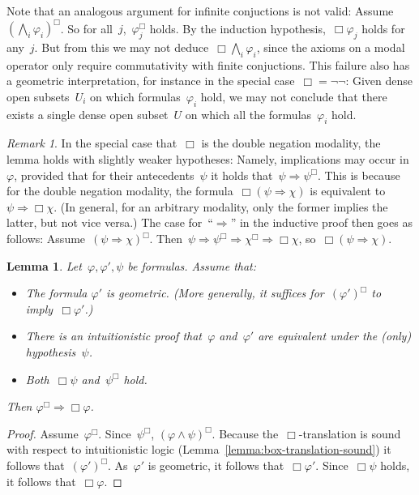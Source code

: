 \documentclass[10pt]{amsart}
\theoremstyle{definition}
\theoremstyle{plain}
\newtheorem{lemma}[defn]{Lemma}
\theoremstyle{remark}
\newtheorem{rem}[defn]{Remark}
\newcommand{\?}{\,{:}\,}
\renewcommand{\_}{\mathpunct{.}\,}
\begin{document}
Note that an analogous argument for infinite conjuctions is not valid:
Assume~$(\bigwedge_i \varphi_i)^\Box$. So for all~$j$,~$\varphi_j^\Box$ holds.
By the induction hypothesis,~$\Box\varphi_j$ holds for any~$j$. But from this
we may not deduce~$\Box\bigwedge_i \varphi_i$, since the axioms on a modal
operator only require commutativity with finite conjuctions. This failure also
has a geometric interpretation, for instance in the special case~$\Box =
\neg\neg$: Given dense open subsets~$U_i$ on which formulas~$\varphi_i$ hold,
we may not conclude that there exists a single dense open subset~$U$ on which
all the formulas~$\varphi_i$ hold.

\begin{rem}In the special case that~$\Box$ is the double negation modality, the
lemma holds with slightly weaker hypotheses: Namely, implications may occur
in~$\varphi$, provided that for their antecedents~$\psi$ it holds that~$\psi
\Rightarrow \psi^\Box$. This is because for the double negation modality,
the formula~$\Box(\psi \Rightarrow \chi)$ is equivalent to~$\psi \Rightarrow
\Box\chi$. (In general, for an arbitrary modality, only the former implies the latter, but not vice versa.) The case
for~``$\Rightarrow$'' in the inductive proof then goes as follows:
Assume~$(\psi \Rightarrow \chi)^\Box$. Then~$\psi \Rightarrow \psi^\Box
\Rightarrow \chi^\Box \Rightarrow \Box\chi$, so~$\Box(\psi \Rightarrow \chi)$.
\end{rem}

\begin{lemma}\label{lemma:stalk-open-with-hypothesis}
Let~$\varphi, \varphi', \psi$ be formulas. Assume that:
\begin{itemize}
\item The formula $\varphi'$ is geometric. (More generally, it suffices for~$(\varphi')^\Box$
to imply~$\Box\varphi'$.)
\item There is an intuitionistic proof that~$\varphi$
and~$\varphi'$ are equivalent under the (only) hypothesis~$\psi$.
\item Both~$\Box\psi$ and~$\psi^\Box$ hold.
\end{itemize}
Then $\varphi^\Box \Rightarrow \Box\varphi$.
\end{lemma}
\begin{proof}
Assume~$\varphi^\Box$. Since~$\psi^\Box$, $(\varphi \wedge \psi)^\Box$. Because
the~$\Box$-translation is sound with respect to intuitionistic logic
(Lemma~\ref{lemma:box-translation-sound})
it follows that~$(\varphi')^\Box$. As~$\varphi'$ is geometric, it follows
that~$\Box\varphi'$. Since~$\Box\psi$ holds, it follows that~$\Box\varphi$.
\end{proof}
\end{document}
